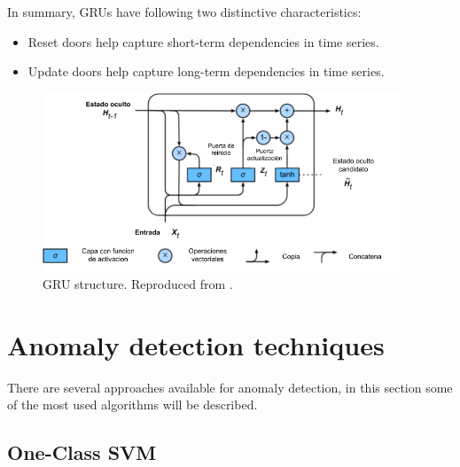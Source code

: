 \vspace{5mm} %

In summary, GRUs have following two distinctive characteristics:

\begin{itemize}
\item Reset doors help capture short-term dependencies in time series.
\item Update doors help capture long-term dependencies in time series.
\end{itemize}

\begin{figure}[h!]
  \begin{center}	\includegraphics[width=0.95\textwidth, frame]{imagenes/Cap4/gru}
  \caption{GRU structure. Reproduced from \protect\cite{Reference56}.} 
  \label{fig:gru}
  \end{center}
\end{figure}


\section{Anomaly detection techniques}

There are several approaches available for anomaly detection, in this section some of the most used algorithms will be described.

\subsection{One-Class SVM}


